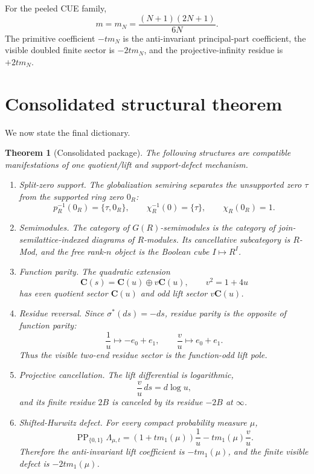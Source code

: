 \documentclass[11pt]{article}
\newcommand{\C}{\mathbf C}
\newcommand{\PP}{\operatorname{PP}}
\theoremstyle{plain}
\newtheorem{theorem}{Theorem}[section]
\theoremstyle{definition}
\numberwithin{equation}{section}
\begin{document}
For the peeled CUE family,
\[
 m=m_N=\frac{(N+1)(2N+1)}{6N}.
\]
The primitive coefficient \(-tm_N\) is the anti-invariant principal-part coefficient, the visible doubled finite sector is \(-2tm_N\), and the projective-infinity residue is \(+2tm_N\).

\section{Consolidated structural theorem}\label{sec:synthesis}

We now state the final dictionary.

\begin{theorem}[Consolidated package]\label{thm:consolidated}
The following structures are compatible manifestations of one quotient/lift and support-defect mechanism.

\begin{enumerate}[label=(\arabic*)]
\item \emph{Split-zero support.}  The globalization semiring separates the unsupported zero \(\tau\) from the supported ring zero \(0_R\):
\[
 p_R^{-1}(0_R)=\{\tau,0_R\},
 \qquad
 \chi_R^{-1}(0)=\{\tau\},
 \qquad
 \chi_R(0_R)=1.
\]

\item \emph{Semimodules.}  The category of \(G(R)\)-semimodules is the category of join-semilattice-indexed diagrams of \(R\)-modules.  Its cancellative subcategory is \(R\)-Mod, and the free rank-\(n\) object is the Boolean cube \(I\mapsto R^I\).

\item \emph{Function parity.}  The quadratic extension
\[
 \C(s)=\C(u)\oplus v\C(u),
 \qquad
 v^2=1+4u
\]
has even quotient sector \(\C(u)\) and odd lift sector \(v\C(u)\).

\item \emph{Residue reversal.}  Since \(\sigma^*(ds)=-ds\), residue parity is the opposite of function parity:
\[
 \frac1u\mapsto -e_0+e_1,
 \qquad
 \frac vu\mapsto e_0+e_1.
\]
Thus the visible two-end residue sector is the function-odd lift pole.

\item \emph{Projective cancellation.}  The lift differential is logarithmic,
\[
 \frac vu\,ds=d\log u,
\]
and its finite residue \(2B\) is canceled by its residue \(-2B\) at \(\infty\).

\item \emph{Shifted-Hurwitz defect.}  For every compact probability measure \(\mu\),
\[
 \PP_{\{0,1\}}\Lambda_{\mu,t}=(1+tm_1(\mu))\frac1u-tm_1(\mu)\frac vu.
\]
Therefore the anti-invariant lift coefficient is \(-tm_1(\mu)\), and the finite visible defect is \(-2tm_1(\mu)\).


\end{enumerate}
\end{theorem}
\end{document}
